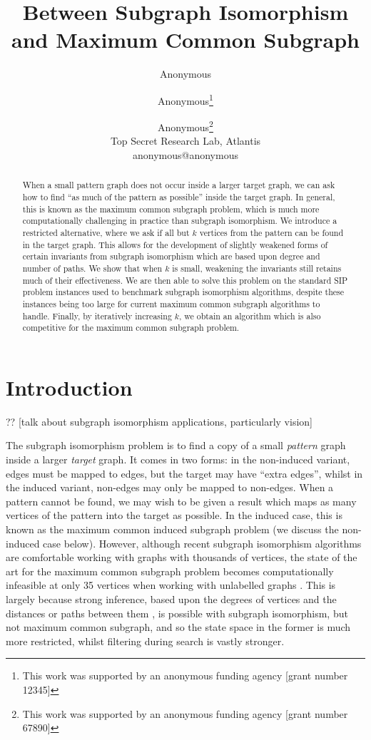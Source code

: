 \documentclass[letterpaper]{article}
\title{Between Subgraph Isomorphism and Maximum Common Subgraph}
\author{Anonymous \and Anonymous\thanks{This work was supported by an anonymous funding agency [grant number 12345]} \and Anonymous\thanks{This work was supported by an anonymous funding agency [grant number 67890]} \\
Top Secret Research Lab, Atlantis \\
anonymous@anonymous}
\newcommand{\citep}[1]{\cite{#1}}
\theoremstyle{definition}
\newcommand{\todo}[1]{{\color{red} {?? [}{#1}{]}}}
\begin{document}
\maketitle

\begin{abstract}
    When a small pattern graph does not occur inside a larger target graph, we can ask how to find
    ``as much of the pattern as possible'' inside the target graph. In general, this is known as the maximum
    common subgraph problem, which is much more computationally challenging in practice than
    subgraph isomorphism. We introduce a restricted alternative, where we ask if all but $k$
    vertices from the pattern can be found in the target graph. This allows for the development of
    slightly weakened forms of certain invariants from subgraph isomorphism which are based upon degree and
    number of paths.  We show that when $k$ is small, weakening the invariants still retains much of
    their effectiveness. We are then able to solve this problem on the standard SIP problem
    instances used to benchmark subgraph isomorphism algorithms, despite these instances being
    too large for current maximum common subgraph algorithms to handle. Finally, by iteratively
    increasing $k$, we obtain an algorithm which is also competitive for the maximum common subgraph
    problem.
\end{abstract}

\section{Introduction}
\todo{talk about subgraph isomorphism applications, particularly vision}

The subgraph isomorphism problem is to find a copy of a small \emph{pattern} graph inside a larger
\emph{target} graph. It comes in two forms: in the non-induced variant, edges must be mapped to
edges, but the target may have ``extra edges'', whilst in the induced variant, non-edges may only be
mapped to non-edges. When a pattern cannot be found, we may wish to be given a result which maps as
many vertices of the pattern into the target as possible. In the induced case, this is known as the
maximum common induced subgraph problem (we discuss the non-induced case below). However, although
recent subgraph isomorphism algorithms are comfortable working with graphs with thousands of
vertices, the state of the art for the maximum common subgraph problem becomes computationally
infeasible at only 35 vertices when working with unlabelled graphs
\citep{DBLP:conf/cp/McCreeshNPS16}. This is largely because strong inference, based upon the degrees
of vertices \citep{DBLP:journals/ai/Solnon10} and the distances or paths between them
\citep{DBLP:conf/cp/AudemardLMGP14,DBLP:conf/cp/McCreeshP15}, is possible with subgraph isomorphism,
but not maximum common subgraph, and so the state space in the former is much more restricted,
whilst filtering during search is vastly stronger.
\end{document}
